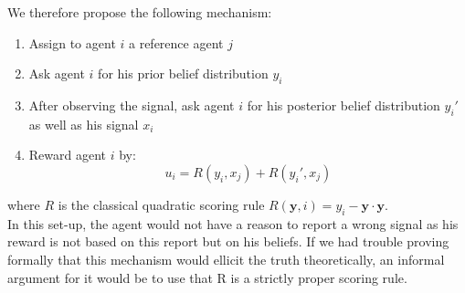 \documentclass{scrartcl}
\begin{document}
We therefore propose the following mechanism:
\begin{enumerate}
\item Assign to agent $i$ a reference agent $j$
\item Ask agent $i$ for his prior belief distribution $y_i$
\item After observing the signal, ask agent $i$ for his posterior belief distribution $y_i'$ as well as his signal $x_i$
\item Reward agent $i$ by:
$$u_i = R(y_i,x_j) + R(y_i',x_j)$$
\end{enumerate}
where $R$ is the classical quadratic scoring rule $R(\mathbf{y},i) = y_i -  \mathbf{y}\cdot\mathbf{y}$.\\

In this set-up, the agent would not have a reason to report a wrong signal as his reward is not based on this report but on his beliefs. If we had trouble proving formally that this mechanism would ellicit the truth theoretically, an informal argument for it would be to use that R is a strictly proper scoring rule.\\
\end{document}
